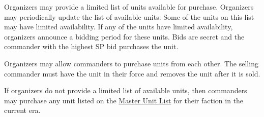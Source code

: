 Organizers may provide a limited list of units available for purchase.
Organizers may periodically update the list of available units.
Some of the units on this list may have limited availability.
If any of the units have limited availability, organizers announce a bidding period for these units.
Bids are secret and the commander with the highest SP bid purchases the unit.

Organizers may allow commanders to purchase units from each other.
The selling commander must have the unit in their force and removes the unit after it is sold.

If organizers do not provide a limited list of available units, then commanders may purchase any unit listed on the \href{http://www.masterunitlist.info}{Master Unit List} for their faction in the current era.
